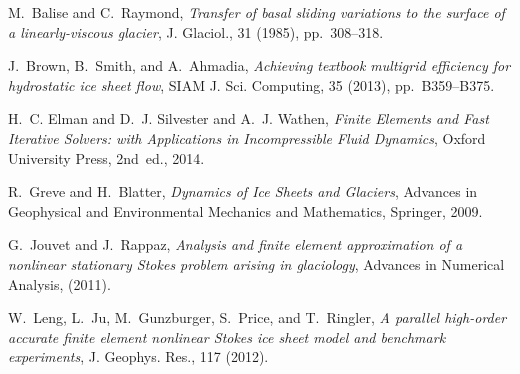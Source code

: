 \documentclass[letterpaper,final,12pt,reqno]{amsart}
\begin{document}
\footnotesize

\bigskip

\begin{thebibliography}{6}

{\sc M.~Balise and C.~Raymond}, {\em Transfer of basal sliding variations to
  the surface of a linearly-viscous glacier}, J. Glaciol., 31 (1985),
  pp.~308--318.

{\sc J.~Brown, B.~Smith, and A.~Ahmadia}, {\em Achieving textbook multigrid
  efficiency for hydrostatic ice sheet flow}, SIAM J. Sci. Computing,
  35 (2013), pp.~B359--B375.

{\sc H.~C. Elman and D.~J. Silvester and A.~J. Wathen}, {\em Finite Elements
  and Fast Iterative Solvers: with Applications in Incompressible Fluid Dynamics},
  Oxford University Press, 2nd~ed., 2014.

{\sc R.~Greve and H.~Blatter}, {\em Dynamics of {I}ce {S}heets and {G}laciers},
  Advances in Geophysical and Environmental Mechanics and Mathematics,
  Springer, 2009.

{\sc G.~Jouvet and J.~Rappaz}, {\em Analysis and finite element approximation
  of a nonlinear stationary {S}tokes problem arising in glaciology}, Advances
  in Numerical Analysis, (2011).

{\sc W.~Leng, L.~Ju, M.~Gunzburger, S.~Price, and T.~Ringler}, {\em A parallel
  high-order accurate finite element nonlinear {S}tokes ice sheet model and
  benchmark experiments}, J. Geophys. Res., 117 (2012).

\end{thebibliography}
\end{document}

